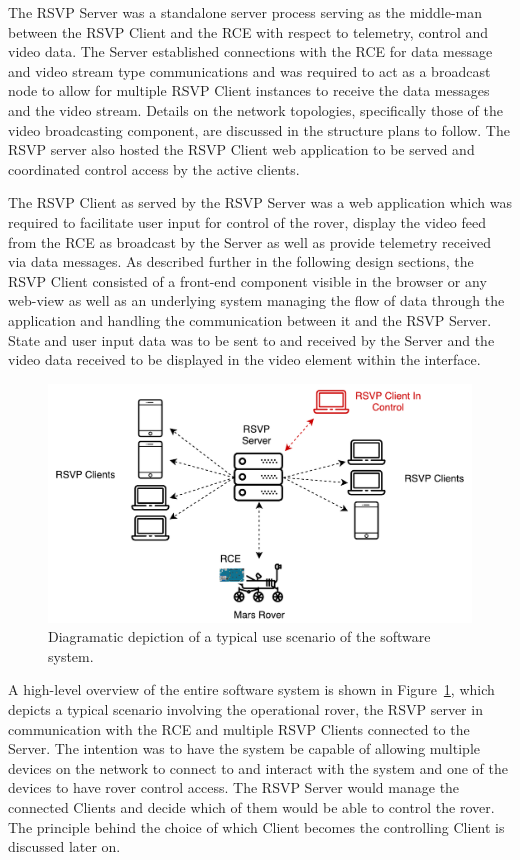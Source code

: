     The RSVP Server was a standalone server process serving as the middle-man between the RSVP Client and the RCE with respect to telemetry, control and video data. The Server established connections with the RCE for data message and video stream type communications and was required to act as a broadcast node to allow for multiple RSVP Client instances to receive the data messages and the video stream. Details on the network topologies, specifically those of the video broadcasting component, are discussed in the structure plans to follow. The RSVP server also hosted the RSVP Client web application to be served and coordinated control access by the active clients.
    
    The RSVP Client as served by the RSVP Server was a web application which was required to facilitate user input for control of the rover, display the video feed from the RCE as broadcast by the Server as well as provide telemetry received via data messages. As described further in the following design sections, the RSVP Client consisted of a front-end component visible in the browser or any web-view as well as an underlying system managing the flow of data through the application and handling the communication between it and the RSVP Server. State and user input data was to be sent to and received by the Server and the video data received to be displayed in the video element within the interface.

    \begin{figure}[h!]
      \centering
      \includegraphics[width=0.7\linewidth]{figures/softDesign-useOverview}
      \caption[Diagramatic depiction of a typical use scenario of the software system.]{Diagramatic depiction of a typical use scenario of the software system.}
      \label{fig:softDesign-useOverview}
    \end{figure}

    A high-level overview of the entire software system is shown in Figure~\ref{fig:softDesign-useOverview}, which depicts a typical scenario involving the operational rover, the RSVP server in communication with the RCE and multiple RSVP Clients connected to the Server. The intention was to have the system be capable of allowing multiple devices on the network to connect to and interact with the system and one of the devices to have rover control access. The RSVP Server would manage the connected Clients and decide which of them would be able to control the rover. The principle behind the choice of which Client becomes the controlling Client is discussed later on.
    
